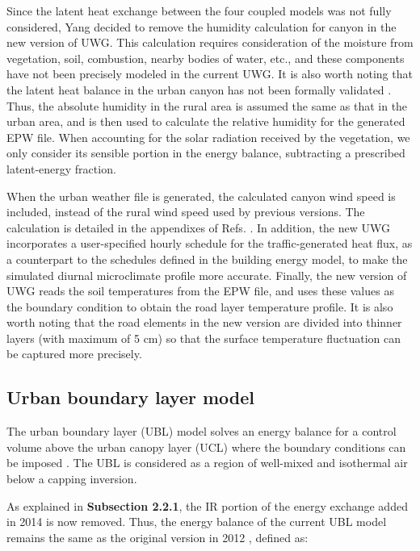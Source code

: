 Since the latent heat exchange between the four coupled models was not fully considered, Yang \cite{yang2016curious} decided to remove the humidity calculation for canyon in the new version of UWG. This calculation requires consideration of the moisture from vegetation, soil, combustion, nearby bodies of water, etc., and these components have not been precisely modeled in the current UWG. It is also worth noting that the latent heat balance in the urban canyon has not been formally validated \cite{bueno2013urban,bueno2014computationally}. Thus, the absolute humidity in the rural area is assumed the same as that in the urban area, and is then used to calculate the relative humidity for the generated EPW file. When accounting for the solar radiation received by the vegetation, we only consider its sensible portion in the energy balance, subtracting a prescribed latent-energy fraction.

When the urban weather file is generated, the calculated canyon wind speed is included, instead of the rural wind speed used by previous versions. The calculation is detailed in the appendixes of Refs. \cite{bueno2013urban,bueno2014computationally}. In addition, the new UWG incorporates a user-specified hourly schedule for the traffic-generated heat flux, as a counterpart to the schedules defined in the building energy model, to make the simulated diurnal microclimate profile more accurate. Finally, the new version of UWG reads the soil temperatures from the EPW file, and uses these values as the boundary condition to obtain the road layer temperature profile. It is also worth noting that the road elements in the new version are divided into thinner layers (with maximum of 5 cm) so that the surface temperature fluctuation can be captured more precisely.

\subsection{Urban boundary layer model}

The urban boundary layer (UBL) model solves an energy balance for a control volume above the urban canopy layer (UCL) where the boundary conditions can be imposed \cite{bueno2013calculation}. The UBL is considered as a region of well-mixed and isothermal air below a capping inversion.

As explained in \textbf{Subsection 2.2.1}, the IR portion of the energy exchange added in 2014 \cite{bueno2014computationally} is now removed. Thus, the energy balance of the current UBL model remains the same as the original version in 2012 \cite{bueno2013calculation}, defined as:

